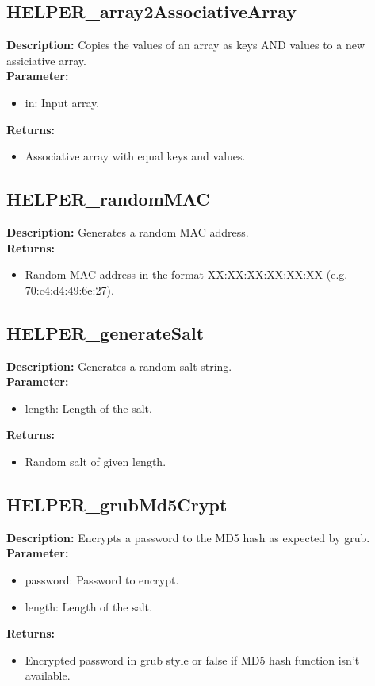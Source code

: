 \subsection{HELPER\_array2AssociativeArray}
\textbf{Description:} Copies the values of an array as keys AND values to a new assiciative array.\\
\textbf{Parameter:}
\begin{itemize}
\item in: Input array.
\end{itemize}
\textbf{Returns:}
\begin{itemize}
\item Associative array with equal keys and values.
\end{itemize}

\subsection{HELPER\_randomMAC}
\textbf{Description:} Generates a random MAC address.\\
\textbf{Returns:}
\begin{itemize}
\item Random MAC address in the format XX:XX:XX:XX:XX:XX (e.g. 70:c4:d4:49:6e:27).
\end{itemize}

\subsection{HELPER\_generateSalt}
\textbf{Description:} Generates a random salt string.\\
\textbf{Parameter:}
\begin{itemize}
\item length: Length of the salt.
\end{itemize}
\textbf{Returns:}
\begin{itemize}
\item Random salt of given length.
\end{itemize}

\subsection{HELPER\_grubMd5Crypt}
\textbf{Description:} Encrypts a password to the MD5 hash as expected by grub.\\
\textbf{Parameter:}
\begin{itemize}
\item password: Password to encrypt.
\item length: Length of the salt.
\end{itemize}
\textbf{Returns:}
\begin{itemize}
\item Encrypted password in grub style or false if MD5 hash function isn't available.
\end{itemize}

